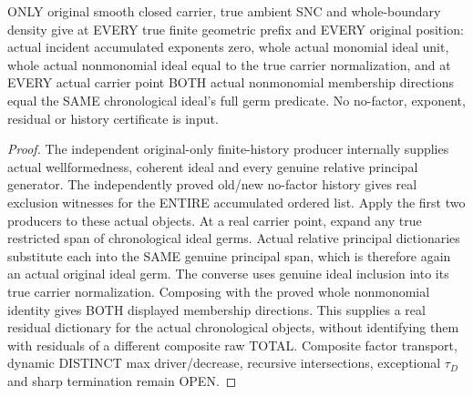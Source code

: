 \begin{theorem}
\label{hir:sharp-original-all-member-chronological-residual-dictionary}
\leanok
ONLY original smooth closed carrier, true ambient SNC and whole-boundary
density give at EVERY true finite geometric prefix and EVERY original
position: actual incident accumulated exponents zero, whole actual monomial
ideal unit, whole actual nonmonomial ideal equal to the true carrier
normalization, and at EVERY actual carrier point BOTH actual nonmonomial
membership directions equal the SAME chronological ideal's full germ
predicate. No no-factor, exponent, residual or history certificate is input.
\end{theorem}
\begin{proof}
The independent original-only finite-history producer internally supplies
actual wellformedness, coherent ideal and every genuine relative principal
generator. The independently proved old/new no-factor history gives real
exclusion witnesses for the ENTIRE accumulated ordered list. Apply the first
two producers to these actual objects. At a real carrier point, expand any
true restricted span of chronological ideal germs. Actual relative principal
dictionaries substitute each into the SAME genuine principal span, which is
therefore again an actual original ideal germ. The converse uses genuine
ideal inclusion into its true carrier normalization. Composing with the
proved whole nonmonomial identity gives BOTH displayed membership directions.
This supplies a real residual dictionary for the actual chronological
objects, without identifying them with residuals of a different composite
raw TOTAL. Composite factor transport, dynamic DISTINCT max driver/decrease,
recursive intersections, exceptional $\tau_D$ and sharp termination remain OPEN.
\end{proof}
